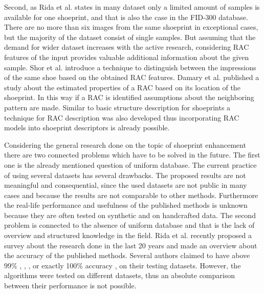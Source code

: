 \documentclass[draft,final]{vutinfth} %
\begin{document}
Second, as Rida et al. \cite{rida2019forensic} states in many dataset only a limited amount of samples is available for one shoeprint, and that is also the case in the FID-300 database.
There are no more than six images from the same shoeprint in exceptional cases, but the majority of the dataset consist of single samples.
But assuming that the demand for wider dataset increases with the active research, considering RAC features of the input provides valuable additional information about the given sample.
Shor et al. \cite{shor2018inherent} introduce a technique to distinguish between the impressions of the same shoe based on the obtained RAC features.
Damary et al. \cite{damary2018dependence} published a study about the estimated properties of a RAC based on its location of the shoeprint.
In this way if a RAC is identified assumptions about the neighboring pattern are made.
Similar to basic structure description for shoeprints \cite{tang2010footwear} a technique for RAC description was also developed \cite{speir2016quantifying} thus incorporating RAC models into shoeprint descriptors is already possible.
\par
Considering the general research done on the topic of shoeprint enhancement there are two connected problems which have to be solved in the future.
The first one is the already mentioned question of uniform database.
The current practice of using several datasets has several drawbacks.
The proposed results are not meaningful and consequential, since the used datasets are not public in many cases and because the results are not comparable to other methods.
Furthermore the real-life performance and usefulness of the published methods is unknown because they are often tested on synthetic and on handcrafted data.
The second problem is connected to the absence of uniform database and that is the lack of overview and structured knowledge in the field.
Rida et al. \cite{rida2019forensic} recently proposed a survey about the research done in the last 20 years and made an overview about the accuracy of the published methods.
Several authors claimed to have above 99\% \cite{algarni2008novel}, \cite{alizadeh2017automatic}, \cite{almaadeed2015partial}, or exactly 100\% accuracy \cite{graham2007automatic}, on their testing datasets.
However, the algorithms were tested on different datasets, thus an absolute comparison between their performance is not possible.
\end{document}
